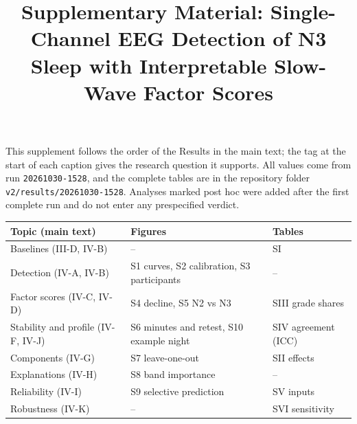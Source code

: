 \documentclass[journal]{IEEEtran}
\begin{document}
\title{Supplementary Material: Single-Channel EEG Detection of N3 Sleep with Interpretable Slow-Wave Factor Scores}
\maketitle

\noindent This supplement follows the order of the Results in the main text; the tag at the start of each caption gives the research question it supports. All values come from run \texttt{20261030-1528}, and the complete tables are in the repository folder \texttt{v2/results/20261030-1528}. Analyses marked post hoc were added after the first complete run and do not enter any prespecified verdict.

\begin{center}\scriptsize
\begin{tabular}{@{}>{\raggedright\arraybackslash}p{2.7cm}>{\raggedright\arraybackslash}p{2.9cm}>{\raggedright\arraybackslash}p{2.0cm}@{}}
\toprule
Topic (main text) & Figures & Tables \\
\midrule
Baselines (III-D, IV-B) & -- & SI \\
Detection (IV-A, IV-B) & S1 curves, S2 calibration, S3 participants & -- \\
Factor scores (IV-C, IV-D) & S4 decline, S5 N2 vs N3 & SIII grade shares \\
Stability and profile (IV-F, IV-J) & S6 minutes and retest, S10 example night & SIV agreement (ICC) \\
Components (IV-G) & S7 leave-one-out & SII effects \\
Explanations (IV-H) & S8 band importance & -- \\
Reliability (IV-I) & S9 selective prediction & SV inputs \\
Robustness (IV-K) & -- & SVI sensitivity \\
\bottomrule
\end{tabular}
\end{center}
\end{document}
